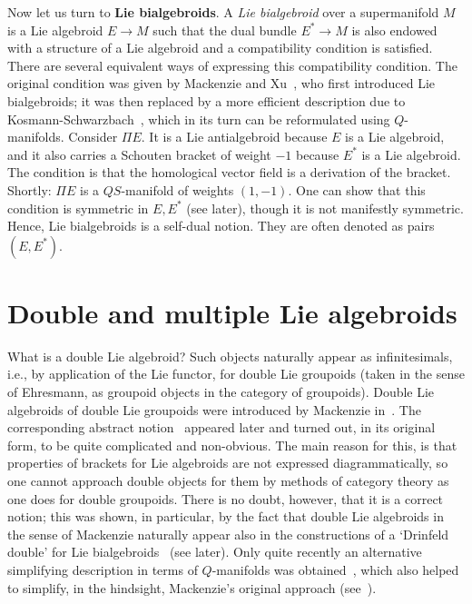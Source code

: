 \documentclass[12pt,reqno,a4paper]{amsart}
\theoremstyle{definition}
\begin{document}
Now let us turn to  \textbf{Lie bialgebroids}. A   \textit{Lie bialgebroid}  over a supermanifold $M$ is a  Lie algebroid $E\to M$ such that the dual bundle $E^*\to M$ is also endowed with a structure of a Lie algebroid and a compatibility condition is satisfied.  There are several equivalent ways of expressing this compatibility condition. The original condition was given by Mackenzie and Xu~\cite{mackenzie:bialg}, who first introduced Lie bialgebroids; it was then replaced by a more efficient description due to Kosmann-Schwarzbach~\cite{yvette:exact}, which in its turn can be reformulated using $Q$-manifolds.
Consider  $\Pi E$. It  is a Lie antialgebroid because $E$ is a Lie algebroid, and it also carries a Schouten bracket of weight $-1$ because $E^*$ is a Lie algebroid. The condition is that the homological vector field is a derivation of the bracket. Shortly: $\Pi E$ is a $QS$-manifold of weights $(1,-1)$. One can show that this condition is symmetric in $E,E^*$ (see later), though it is not manifestly symmetric. Hence, Lie bialgebroids is a self-dual notion. They are often denoted as pairs $(E,E^*)$.

\section{Double and multiple Lie algebroids}

What is a double Lie algebroid? Such objects  naturally appear as
infinitesimals, i.e., by application of the Lie functor, for double
Lie groupoids (taken in the sense of Ehresmann, as groupoid objects
in the category of groupoids). Double Lie algebroids of double Lie
groupoids were introduced by Mackenzie
in~\cite{mackenzie:secondorder1}. The corresponding abstract
notion~\cite{mackenzie:secondorder2} appeared later and turned out,
in its original form, to be quite complicated and non-obvious. The
main reason for this, is that properties of brackets for Lie
algebroids are not expressed diagrammatically, so one cannot
approach double objects for them by methods of category theory as
one does for double groupoids. There is no doubt, however, that it
is a correct notion; this was shown, in particular, by the fact that
double Lie algebroids in the sense of Mackenzie naturally appear
also in the constructions of a `Drinfeld double' for Lie
bialgebroids~\cite{mackenzie:doublealg, mackenzie:drinfeld} (see
later). Only quite recently an alternative simplifying description
in terms of $Q$-manifolds was obtained~\cite{tv:double}, which also
helped to simplify, in the hindsight, Mackenzie's original approach
(see~\cite{mackenzie:ehresman}).
\end{document}
